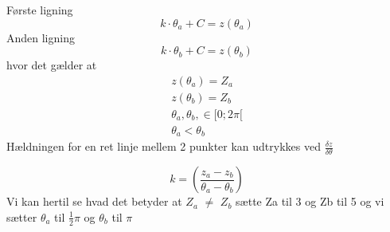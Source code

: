 \documentclass[12pt]{article}
\begin{document}
Første ligning
\begin{equation}
k\cdot \theta_a + C = z(\theta_a)
\end{equation}
Anden ligning
\begin{equation}
k\cdot \theta_b + C = z(\theta_b)
\end{equation}
hvor det gælder at
\begin{equation}
\begin{gathered}
z(\theta_a)=Z_a \\
z(\theta_b)=Z_b\\
\theta_a,\theta_b,\in[0;2\pi[ \\
\theta_a < \theta_b
\end{gathered}
\end{equation}
Hældningen for en ret linje mellem 2 punkter kan udtrykkes ved $\frac{\delta z}{\delta \theta}$

\begin{equation}
k=(\frac{z_a-z_b}{\theta_a-\theta_b})
\end{equation}
Vi kan hertil se hvad det betyder at $Z_a$ $\neq$
$Z_b$ sætte Za til 3 og Zb til 5 og vi sætter $\theta_a$ til $\frac{1}{2} \pi$ og $\theta_b$ til $\pi$
\end{document}
